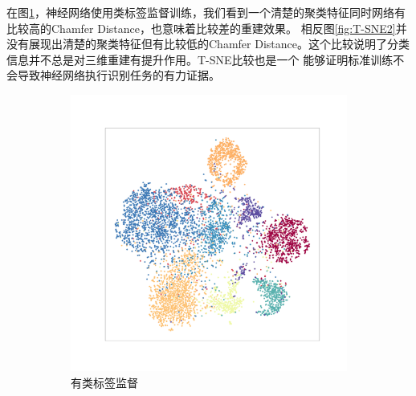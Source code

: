 \documentclass[bachelor, nocolorlinks, printoneside]{seuthesis} %
\begin{document}
\begin{Main}
\begin{enumerate}
    在图\ref{fig:T-SNE1}，神经网络使用类标签监督训练，我们看到一个清楚的聚类特征同时网络有比较高的Chamfer Distance，也意味着比较差的重建效果。
    相反图\ref{fig:T-SNE2}并没有展现出清楚的聚类特征但有比较低的Chamfer Distance。这个比较说明了分类信息并不总是对三维重建有提升作用。T-SNE比较也是一个
    能够证明标准训练不会导致神经网络执行识别任务的有力证据。
\end{enumerate}

\begin{figure}
	\begin{subfigure}[t]{0.3\linewidth} \centering 
     \includegraphics[width=\columnwidth]{figs/T-SNE-class.png}
     \caption{有类标签监督}\label{fig:T-SNE1}
   \end{subfigure}
   \begin{subfigure}[t]{0.3\linewidth} \centering

\end{subfigure}
\end{figure}
\end{Main}
\end{document}
